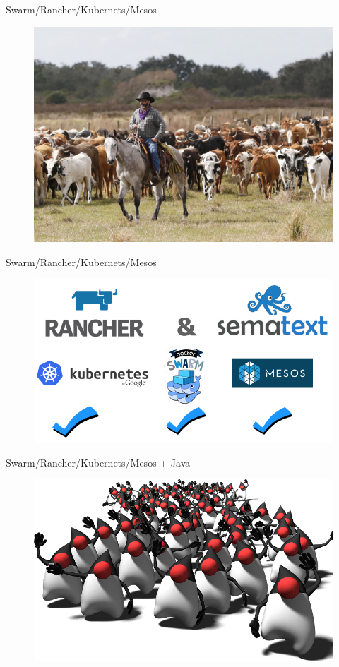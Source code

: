 \documentclass{beamer}
\begin{document}
\begin{frame}{Swarm/Rancher/Kubernets/Mesos}
\begin{figure}
	\centering
	\includegraphics[width=0.8\linewidth]{Images/cowboy}
\end{figure}
\end{frame}

\begin{frame}{Swarm/Rancher/Kubernets/Mesos}
\begin{figure}
	\centering
	\includegraphics[width=0.8\linewidth]{Images/rancher}
\end{figure}
\end{frame}

\begin{frame}{Swarm/Rancher/Kubernets/Mesos + Java}
\begin{figure}
	\centering
	\includegraphics[width=0.8\linewidth]{Images/dukearmy}
\end{figure}
\end{frame}
\end{document}
